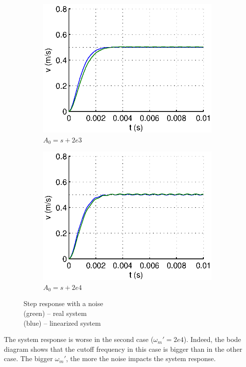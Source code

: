 \begin{figure}[hb]
  \centering
  \begin{subfigure}[b]{\linewidth}
   \includegraphics[width=\columnwidth]{fig/step_wm_noise.eps}
   \caption{$A_0 = s+2e3$}
  \end{subfigure}
  \begin{subfigure}[b]{\linewidth}
  \includegraphics[width=\columnwidth]{fig/step_10wm_noise.eps}
   \caption{$A_0 = s + 2e4$}
  \end{subfigure}
 \caption{Step response with a noise \\ (green) -- real system \\ (blue) -- linearized system}
 \label{noise}
\end{figure}


The system response is worse in the second case ($\omega_m' = 2e4$). Indeed, the bode diagram shows that the cutoff frequency in this case is bigger than in the other case. The bigger $\omega_m'$, the more the noise impacts the system response.




